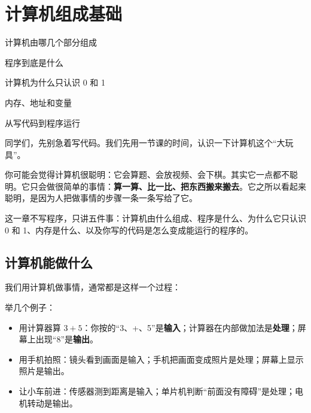 \chapter{计算机组成基础}

\begin{introduction}
  \item 计算机由哪几个部分组成
  \item 程序到底是什么
  \item 计算机为什么只认识 0 和 1
  \item 内存、地址和变量
  \item 从写代码到程序运行
\end{introduction}


同学们，先别急着写代码。我们先用一节课的时间，认识一下计算机这个“大玩具”。

你可能会觉得计算机很聪明：它会算题、会放视频、会下棋。其实它一点都不聪明。它只会做很简单的事情：\textbf{算一算、比一比、把东西搬来搬去}。它之所以看起来聪明，是因为人把做事情的步骤一条一条写给了它。

这一章不写程序，只讲五件事：计算机由什么组成、程序是什么、为什么它只认识 0 和 1、内存是什么、以及你写的代码是怎么变成能运行的程序的。

\section{计算机能做什么}

我们用计算机做事情，通常都是这样一个过程：

\begin{center}
\end{center}

举几个例子：

\begin{itemize}
  \item 用计算器算 $3+5$：你按的“3、+、5”是\textbf{输入}；计算器在内部做加法是\textbf{处理}；屏幕上出现“8”是\textbf{输出}。
  \item 用手机拍照：镜头看到画面是输入；手机把画面变成照片是处理；屏幕上显示照片是输出。
  \item 让小车前进：传感器测到距离是输入；单片机判断“前面没有障碍”是处理；电机转动是输出。
\end{itemize}

